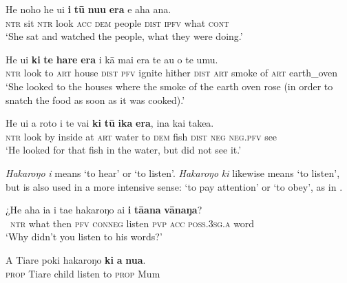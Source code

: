 \ea\label{ex:8.112}
\gll He noho he u{\ꞌ}i \textbf{i} \textbf{tū} \textbf{nu{\ꞌ}u} \textbf{era} e aha {\ꞌ}ana. \\
\textsc{ntr} sit \textsc{ntr} look \textsc{acc} \textsc{dem} people \textsc{dist} \textsc{ipfv} what \textsc{cont} \\

\glt 
‘She sat and watched the people, what they were doing.’ \textstyleExampleref{[R229.332]} 
\z

\ea\label{ex:8.113}
\gll He u{\ꞌ}i \textbf{ki} \textbf{te} \textbf{hare} \textbf{era} i kā mai era te {\ꞌ}au o te {\ꞌ}umu.  \\
\textsc{ntr} look to \textsc{art} house \textsc{dist} \textsc{pfv} ignite hither \textsc{dist} \textsc{art} smoke of \textsc{art} earth\_oven  \\

\glt 
‘She looked to the houses where the smoke of the earth oven rose (in order to snatch the food as soon as it was cooked).’ \textstyleExampleref{[R368.004]} 
\z

\ea\label{ex:8.114}
\gll He u{\ꞌ}i a roto i te vai \textbf{ki} \textbf{tū} \textbf{ika} \textbf{era}, {\ꞌ}ina kai take{\ꞌ}a.\\
\textsc{ntr} look by inside at \textsc{art} water to \textsc{dem} fish \textsc{dist} \textsc{neg} \textsc{neg.pfv} see\\

\glt
‘He looked for that fish in the water, but did not see it.’ \textstyleExampleref{[R301.232]} 
\z

\textit{Hakaroŋo} \textit{i} means ‘to hear’ or ‘to listen’. \textit{Hakaroŋo} \textit{ki} likewise means ‘to listen’, but is also used in a more intensive sense: ‘to pay attention’ or ‘to obey’, as in .

\ea\label{ex:8.115}
\gll ¿He aha ia i ta{\ꞌ}e hakaroŋo ai \textbf{i} \textbf{tā{\ꞌ}ana} \textbf{vānaŋa}? \\
~\textsc{ntr} what then \textsc{pfv} \textsc{conneg} listen \textsc{pvp} \textsc{acc} \textsc{poss.3sg.a} word \\

\glt 
‘Why didn’t you listen to his words?’ \textstyleExampleref{[Luke 20:5]}
\z

\ea\label{ex:8.116}
\gll A Tiare poki hakaroŋo \textbf{ki} \textbf{a} \textbf{nua}. \\
\textsc{prop} Tiare child listen to \textsc{prop} Mum \\

